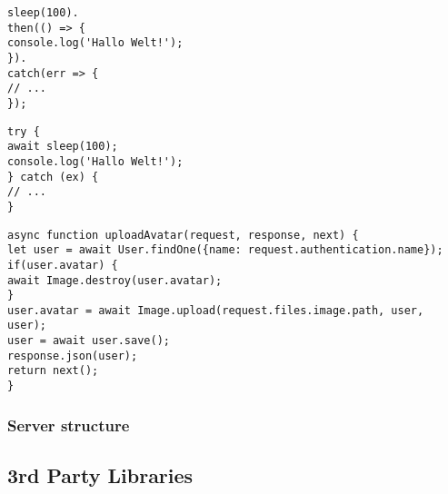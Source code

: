 \begin{minipage}[b]{0.45\linewidth}
	\centering
	\label{lst:callback}
\begin{lstlisting}[caption={Old version of 'Hello World' code using callbacks.}]
sleep(100).
then(() => {
console.log('Hallo Welt!');
}).
catch(err => {
// ...
});
\end{lstlisting}
\end{minipage}
\hspace{0.5cm}
\begin{minipage}[b]{0.45\linewidth}
	\centering
	\label{lst:async}
\begin{lstlisting}[caption={New version of 'Hello World' code using callbacks within an \texttt{async} function.}]
try {
await sleep(100);
console.log('Hallo Welt!');
} catch (ex) {
// ...
}
\end{lstlisting}
\end{minipage}

\begin{lstlisting}[caption={Example of more complex function uploading an avatar of a user to the database.}, label=lst:uploadavatar]
async function uploadAvatar(request, response, next) {
let user = await User.findOne({name: request.authentication.name});
if(user.avatar) {
await Image.destroy(user.avatar);
}
user.avatar = await Image.upload(request.files.image.path, user, user);
user = await user.save();
response.json(user);
return next();
}
\end{lstlisting}

\subsubsection{Server structure}
\label{subsubsec:serverstructure}

\subsection{3rd Party Libraries}
\label{subsec:3rdpartylibs}


